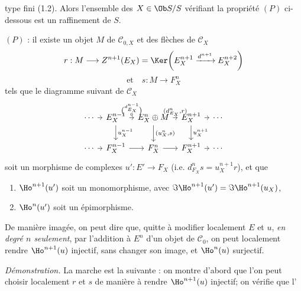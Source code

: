 type fini (1.2). Alors l'ensemble des \(X\in\Ob S/S\) vérifiant la propriété \((P)\) ci-dessous est un raffinement de \(S\).

\((P)\) : il existe un objet \(M\) de \(\mathcal C_{0,X}\) et des flèches de \(\mathcal C_X\)
\[
  r:M\longrightarrow Z^{n+1}(E_X)=
  \Ker\!\left(E_X^{n+1}\xrightarrow{d^{n+1}}E_X^{n+2}\right)
\]
\[
  \text{et}\quad s:M\longrightarrow F_X^n
\]
tels que le diagramme suivant de \(\mathcal C_X\)
\[
\begin{tikzcd}[column sep=tiny]
\cdots \arrow[r] & E_X^{n-1}
 \arrow[r,"{\binom{d_{E_X}^{n-1}}{0}}"]
 \arrow[d,"u_X^{n-1}"] &
E_X^n\oplus M
 \arrow[r,"{(d_{E_X}^n,r)}"]
 \arrow[d,"{(u_X^n,s)}"] &
E_X^{n+1} \arrow[r] \arrow[d,"u_X^{n+1}"] &
\cdots\\
\cdots \arrow[r] & F_X^{n-1} \arrow[r] &
F_X^n \arrow[r] &
F_X^{n+1} \arrow[r] &
\cdots
\end{tikzcd}
\]
soit un morphisme de complexes \(u':E'\to F_X\) (i.e. \(d_{F_X}^n s=u_X^{n+1}r\)), et que
\begin{enumerate}[label=(\roman*)]
\item \(\Ho^{n+1}(u')\) soit un monomorphisme, avec \(\Im\Ho^{n+1}(u')=\Im\Ho^{n+1}(u_X)\),
\item \(\Ho^n(u')\) soit un épimorphisme.
\end{enumerate}

De manière imagée, on peut dire que, quitte à modifier localement \(E\) et \(u\), \emph{en degré \(n\) seulement}, par l'addition à \(E^n\) d'un objet de \(\mathcal C_0\), on peut localement rendre \(\Ho^{n+1}(u)\) injectif, sans changer son image, et \(\Ho^n(u)\) surjectif.

\emph{Démonstration.} La marche est la suivante : on montre d'abord que l'on peut choisir localement \(r\) et \(s\) de manière à rendre \(\Ho^{n+1}(u)\) injectif; on vérifie que l'%
